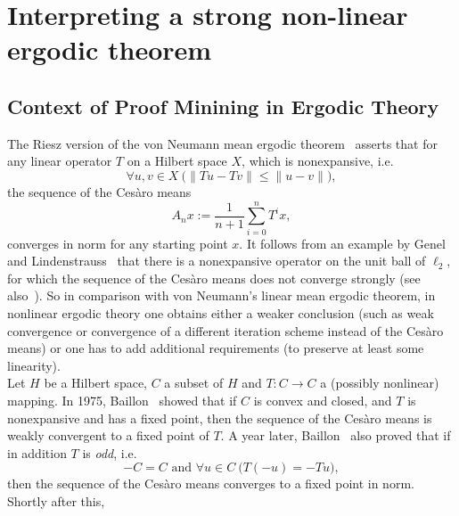 \section{Interpreting a strong non-linear ergodic theorem}

\subsection*{Context of Proof Minining in Ergodic Theory}

The Riesz version of the von Neumann mean ergodic theorem~\cite{Neumann1932} asserts that for any linear operator $T$ on a Hilbert space $X$, which is nonexpansive, i.e. 
\[
\forall u,v\in X\ \big(\|Tu-Tv\|\leq\|u-v\|\big),
\]
the sequence of the  Ces{\`a}ro means
\[
A_nx:=\frac{1}{n+1}\sum^{n}_{i=0} T^i x,
\]
converges in norm for any starting point $x$. 
It follows from an example 
by Genel and Lindenstrauss~\cite{Genel1975} that there is a nonexpansive operator on
the unit ball of $\ell_2$, for which the sequence of the  Ces{\`a}ro means does not converge strongly (see also~\cite{Krengel1985}).
So in comparison with von Neumann's linear mean ergodic theorem, in nonlinear ergodic theory 
one obtains either a weaker conclusion (such as weak convergence or convergence of a different
iteration scheme instead of the Ces{\`a}ro means) or one has to add additional requirements 
(to preserve at least some linearity).\\ 
Let $H$ be a Hilbert space, $C$ a subset of $H$ and
$T:C\to C$ a (possibly nonlinear) mapping. In 1975, Baillon~\cite{Baillon1975} showed  that if $C$ is convex and closed,
and $T$ is nonexpansive and has a fixed point, then the sequence of the Ces{\`a}ro means is weakly convergent to a fixed point of $T$.
A year later, Baillon~\cite{Baillon1976} also proved that if in addition $T$ is {\em odd}, i.e.
\[
-C = C\text{ and } \forall u\in C\ \big( T(-u)=-Tu\big),
\]
then the sequence of the Ces{\`a}ro means converges to a fixed point in norm. Shortly after this,
